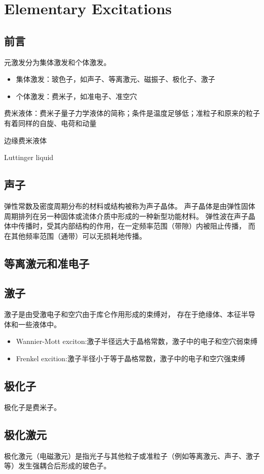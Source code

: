 \section{Elementary Excitations}

\subsection{前言}
元激发分为集体激发和个体激发。
\begin{itemize}
    \item 集体激发：玻色子，如声子、等离激元、磁振子、极化子、激子
    \item 个体激发：费米子，如准电子、准空穴
\end{itemize}

费米液体：费米子量子力学液体的简称；条件是温度足够低；准粒子和原来的粒子有着同样的自旋、电荷和动量

边缘费米液体

Luttinger liquid

\subsection{声子}

弹性常数及密度周期分布的材料或结构被称为声子晶体。
声子晶体是由弹性固体周期排列在另一种固体或流体介质中形成的一种新型功能材料。
弹性波在声子晶体中传播时，受其内部结构的作用，在一定频率范围（带隙）内被阻止传播，
而在其他频率范围（通带）可以无损耗地传播。

\subsection{等离激元和准电子}

\subsection{激子}

激子是由受激电子和空穴由于库仑作用形成的束缚对，
存在于绝缘体、本征半导体和一些液体中。
\begin{itemize}
    \item Wannier-Mott exciton:激子半径远大于晶格常数，激子中的电子和空穴弱束缚
    \item Frenkel excition:激子半径小于等于晶格常数，激子中的电子和空穴强束缚
\end{itemize}

\subsection{极化子}

极化子是费米子。

\subsection{极化激元}

极化激元（电磁激元）是指光子与其他粒子或准粒子（例如等离激元、声子、激子等）发生强耦合后形成的玻色子。
